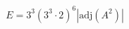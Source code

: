 \documentclass[preview]{standalone}
\begin{document}
\begin{align*}
E = 3^3 (3^3 \cdot 2)^6 |\text{adj}(A^2)|
\end{align*}
\end{document}
